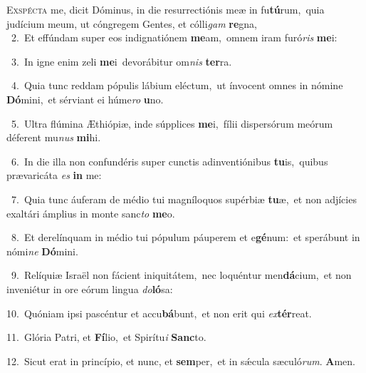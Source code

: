 \lettrine{\initial\textcolor{\initialcolor}{E}}{xspécta} me, dicit Dóminus, in die resurrectiónis meæ in fu\-\textbf{tú}\-rum,~\star quia judícium meum, ut cóngregem Gentes, et cólli\textit{gam} \textbf{re}\-gna,\\
{\numbfont\textcolor{\numbcolor}{~2.}}~Et effúndam super eos indignatiónem \textbf{me}\-am,~\star omnem iram furó\textit{ris} \textbf{me}\-i:\par
{\numbfont\textcolor{\numbcolor}{~3.}}~In igne enim zeli \textbf{me}\-i~\star devorábitur om\textit{nis} \textbf{ter}\-ra.\par
{\numbfont\textcolor{\numbcolor}{~4.}}~Quia tunc reddam pópulis lábium eléctum,~\dagger ut ínvocent omnes in nómine \textbf{Dó}\-mini,~\star et sérviant ei húme\textit{ro} \textbf{u}\-no.\par
{\numbfont\textcolor{\numbcolor}{~5.}}~Ultra flúmina Æthiópiæ, inde súpplices \textbf{me}\-i,~\star fílii dispersórum meórum déferent mu\textit{nus} \textbf{mi}\-hi.\par
{\numbfont\textcolor{\numbcolor}{~6.}}~In die illa non confundéris super cunctis adinventiónibus \textbf{tu}\-is,~\star quibus prævaricáta \textit{es} \textbf{in} me:\par
{\numbfont\textcolor{\numbcolor}{~7.}}~Quia tunc áuferam de médio tui magníloquos supérbiæ \textbf{tu}\-æ,~\star et non adjícies exaltári ámplius in monte sanc\textit{to} \textbf{me}\-o.\par
{\numbfont\textcolor{\numbcolor}{~8.}}~Et derelínquam in médio tui pópulum páuperem et e\-\textbf{gé}\-num:~\star et sperábunt in nómi\textit{ne} \textbf{Dó}\-mini.\par
{\numbfont\textcolor{\numbcolor}{~9.}}~Relíquiæ Israël non fácient iniquitátem,~\dagger nec loquéntur men\-\textbf{dá}\-cium,~\star et non inveniétur in ore eórum lingua \textit{do}\-\textbf{ló}sa:\par
{\numbfont\textcolor{\numbcolor}{10.}}~Quóniam ipsi pascéntur et accu\-\textbf{bá}\-bunt,~\star et non erit qui \textit{ex}\-\textbf{tér}reat.\par
{\numbfont\textcolor{\numbcolor}{11.}}~Glória Patri, et \textbf{Fí}\-lio,~\star et Spirítu\textit{i} \textbf{Sanc}\-to.\par
{\numbfont\textcolor{\numbcolor}{12.}}~Sicut erat in princípio, et nunc, et \textbf{sem}\-per,~\star et in sǽcula sæculó\-\textit{rum}\-. \textbf{A}\-men.\par
